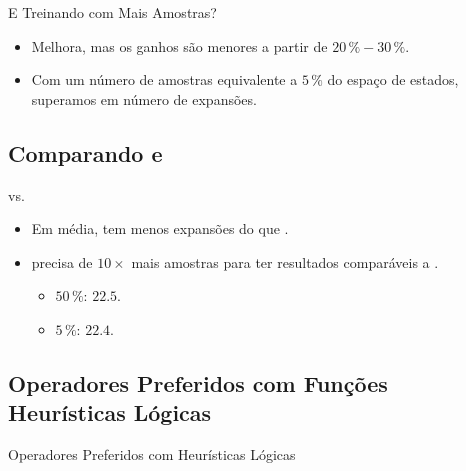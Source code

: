 \documentclass{beamer}
\begin{document}
\begin{frame}{E Treinando com Mais Amostras?}

\begin{itemize}
  \item Melhora, mas os ganhos são menores a partir de $20\,\% - 30\,\%$.
  \pause
  \item Com um número de amostras equivalente a \alert{$5\,\%$} do espaço de estados, \alert{superamos \poff} em número de expansões.
\end{itemize}
\end{frame}

\subsection{Comparando \bfsrs e \bfsrw}
\begin{frame}{\bfsrs vs. \bfsrw}

\begin{itemize}
  \item Em média, \pog \alert{tem menos expansões do que} \pofsm.
  \pause
  \item \pofsm \alert{precisa de $10\times$ mais amostras} para ter resultados comparáveis a \pog.
    \begin{itemize}
      \item \pofsm $50\,\%$: $22.5$.
      \item \pog $5\,\%$: $22.4$.
    \end{itemize}
\end{itemize}
\end{frame}

\subsection{Operadores Preferidos com Funções Heurísticas Lógicas}
\begin{frame}{Operadores Preferidos com Heurísticas Lógicas}

\begin{itemize}
\end{itemize}
\end{frame}
\end{document}
